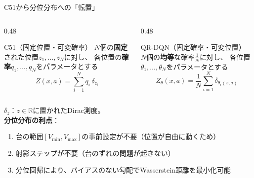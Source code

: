 \documentclass[aspectratio=169, dvipdfmx, 11pt]{beamer}
\newcommand{\blue}[1]{\textcolor{blue!80!black}{#1}}
\begin{document}
\begin{frame}{C51から分位分布への「転置」}
  \begin{columns}[T]
    \begin{column}{0.48\textwidth}
      \begin{block}{C51（固定位置・可変確率）}
        {\small
        $N$個の\textbf{固定}された位置$z_1, \dots, z_N$に対し、
        各位置の\textbf{確率}$q_1, \dots, q_N$をパラメータとする
        \[
          Z(x,a) = \sum_{i=1}^{N} q_i \, \delta_{z_i}
        \]
        }
      \end{block}
    \end{column}
    \begin{column}{0.48\textwidth}
      \begin{exampleblock}{QR-DQN（固定確率・可変位置）}
        {\small
        $N$個の\textbf{均等}な確率$\frac{1}{N}$に対し、
        各位置$\theta_1, \dots, \theta_N$を\alert{パラメータ}とする
        \[
          Z_\theta(x,a) = \frac{1}{N}\sum_{i=1}^{N} \delta_{\theta_i(x,a)}
        \]
        }
      \end{exampleblock}
    \end{column}
  \end{columns}
  \vfill
  {\small $\delta_z$：$z \in \mathbb{R}$に置かれたDirac測度。}\\[4pt]
  \textbf{分位分布の利点}：
  \begin{enumerate}
    \item 台の範囲$[V_{\min}, V_{\max}]$の\blue{事前設定が不要}（位置が自由に動くため）
    \item 射影ステップが\blue{不要}（台のずれの問題が起きない）
    \item \alert{分位回帰}により、バイアスのない勾配でWasserstein距離を最小化可能
  \end{enumerate}
\end{frame}
\end{document}
